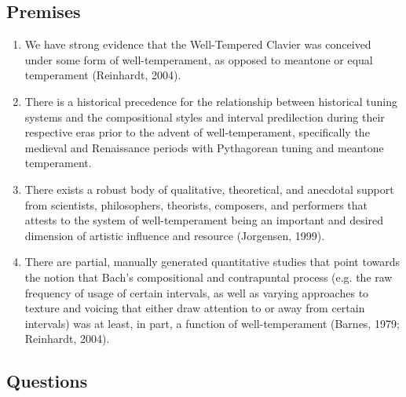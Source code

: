 \subsection{Premises}\label{premises}

\begin{enumerate}
\def\labelenumi{\arabic{enumi}.}
\tightlist
\item
  We have strong evidence that the Well-Tempered Clavier was conceived
  under some form of well-temperament, as opposed to meantone or equal
  temperament (Reinhardt, 2004).
\item
  There is a historical precedence for the relationship between
  historical tuning systems and the compositional styles and interval
  predilection during their respective eras prior to the advent of
  well-temperament, specifically the medieval and Renaissance periods
  with Pythagorean tuning and meantone temperament.
\item
  There exists a robust body of qualitative, theoretical, and anecdotal
  support from scientists, philosophers, theorists, composers, and
  performers that attests to the system of well-temperament being an
  important and desired dimension of artistic influence and resource
  (Jorgensen, 1999).
\item
  There are partial, manually generated quantitative studies that point
  towards the notion that Bach's compositional and contrapuntal process
  (e.g. the raw frequency of usage of certain intervals, as well as
  varying approaches to texture and voicing that either draw attention
  to or away from certain intervals) was at least, in part, a function
  of well-temperament (Barnes, 1979; Reinhardt, 2004).
\end{enumerate}

\subsection{Questions}\label{questions}

